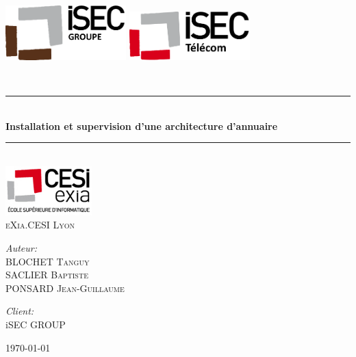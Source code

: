 \documentclass[12pt]{article}
\begin{document}
\newcommand{\HRule}{\rule{\linewidth}{0.5mm}}


\begin{titlepage}
\begin{center}

\includegraphics[width=0.35\textwidth]{img/Logo-groupe.png}
\hspace{5cm}
\includegraphics[width=0.35\textwidth]{img/Logo-telecom.png}~\\[1cm]
\vspace{1cm}


\textsc{\Large }\\[0.5cm]

\HRule \\[0.4cm]

{\huge \bfseries
Installation et supervision d'une architecture d'annuaire \\[0.4cm] }

\HRule \\[2cm]
\includegraphics[width=0.25\textwidth]{img/logo_exia.jpg}~\\[1cm]
\textsc{\LARGE eXia.CESI Lyon}\\[1.5cm]

\vspace{2.5cm}

\begin{minipage}{0.5\textwidth}
\begin{flushleft} \large
\emph{Auteur:}\\
BLOCHET \textsc{Tanguy}\\
SACLIER \textsc{Baptiste}\\
PONSARD \textsc{Jean-Guillaume}
\end{flushleft}
\end{minipage}
\begin{minipage}{0.4\textwidth}
\begin{flushright} \large
\emph{Client:} \\
iSEC \textsc{GROUP}
\end{flushright}
\end{minipage}

\vfill

{\large \today}

\end{center}
\end{titlepage}
\end{document}
